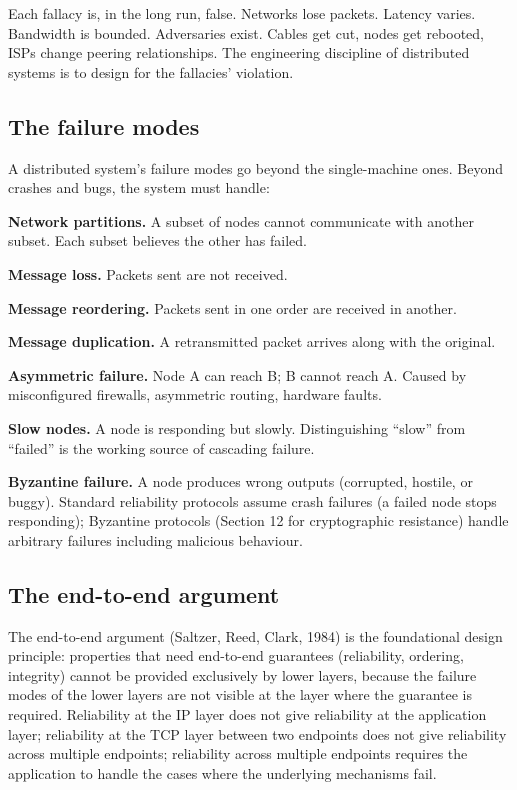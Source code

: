 Each fallacy is, in the long run, false. Networks lose packets. Latency varies. Bandwidth is bounded. Adversaries exist. Cables get cut, nodes get rebooted, ISPs change peering relationships. The engineering discipline of distributed systems is to design for the fallacies' violation.

\subsection{The failure modes}

A distributed system's failure modes go beyond the single-machine ones. Beyond crashes and bugs, the system must handle:

\textbf{Network partitions.} A subset of nodes cannot communicate with another subset. Each subset believes the other has failed.

\textbf{Message loss.} Packets sent are not received.

\textbf{Message reordering.} Packets sent in one order are received in another.

\textbf{Message duplication.} A retransmitted packet arrives along with the original.

\textbf{Asymmetric failure.} Node A can reach B; B cannot reach A. Caused by misconfigured firewalls, asymmetric routing, hardware faults.

\textbf{Slow nodes.} A node is responding but slowly. Distinguishing ``slow'' from ``failed'' is the working source of cascading failure.

\textbf{Byzantine failure.} A node produces wrong outputs (corrupted, hostile, or buggy). Standard reliability protocols assume crash failures (a failed node stops responding); Byzantine protocols (Section 12 for cryptographic resistance) handle arbitrary failures including malicious behaviour.

\subsection{The end-to-end argument}

The end-to-end argument (Saltzer, Reed, Clark, 1984) is the foundational design principle: properties that need end-to-end guarantees (reliability, ordering, integrity) cannot be provided exclusively by lower layers, because the failure modes of the lower layers are not visible at the layer where the guarantee is required. Reliability at the IP layer does not give reliability at the application layer; reliability at the TCP layer between two endpoints does not give reliability across multiple endpoints; reliability across multiple endpoints requires the application to handle the cases where the underlying mechanisms fail.

